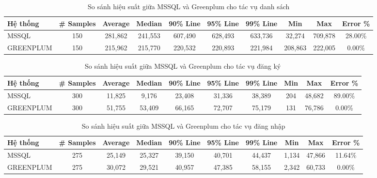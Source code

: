 \documentclass{article}[14pt]
\begin{document}
\begin{table}[htbp]
\centering
\renewcommand{\arraystretch}{1.2} %
\setlength{\tabcolsep}{3.2pt} %
\begin{tabular}{|l|c|c|c|c|c|c|c|c|c|}
\hline
\textbf{Hệ thống} & \textbf{\# Samples} & \textbf{Average} & \textbf{Median} & \textbf{90\% Line} & \textbf{95\% Line} & \textbf{99\% Line} & \textbf{Min} & \textbf{Max} & \textbf{Error \%} \\ \hline
MSSQL & 150 & 281,862 & 241,553 & 607,490 & 628,493 & 633,736 & 32,274 & 709,878 & 28.00\% \\ \hline
GREENPLUM & 150 & 215,962 & 215,770 & 220,532 & 220,893 & 221,984 & 208,863 & 222,005 & 0.00\% \\ \hline
\end{tabular}
\caption{So sánh hiệu suất giữa MSSQL và Greenplum cho tác vụ danh sách}
\label{tab:performance_comparison_list}
\end{table}


\begin{table}[htbp]
\centering
\renewcommand{\arraystretch}{1.2} %
\setlength{\tabcolsep}{4pt} %
\begin{tabular}{|l|c|c|c|c|c|c|c|c|c|}
\hline
\textbf{Hệ thống} & \textbf{\# Samples} & \textbf{Average} & \textbf{Median} & \textbf{90\% Line} & \textbf{95\% Line} & \textbf{99\% Line} & \textbf{Min} & \textbf{Max} & \textbf{Error \%} \\ \hline
MSSQL & 300 & 11,825 & 9,176 & 23,408 & 31,336 & 38,389 & 204 & 48,682 & 89.00\% \\ \hline
GREENPLUM & 300 & 51,755 & 53,409 & 66,165 & 72,707 & 75,179 & 131 & 76,786 & 0.00\% \\ \hline
\end{tabular}
\caption{So sánh hiệu suất giữa MSSQL và Greenplum cho tác vụ đăng ký}
\label{tab:performance_comparison_registration}
\end{table}

\begin{table}[htbp]
\centering
\renewcommand{\arraystretch}{1.2} %
\setlength{\tabcolsep}{3.9pt} %
\begin{tabular}{|l|c|c|c|c|c|c|c|c|c|}
\hline
\textbf{Hệ thống} & \textbf{\# Samples} & \textbf{Average} & \textbf{Median} & \textbf{90\% Line} & \textbf{95\% Line} & \textbf{99\% Line} & \textbf{Min} & \textbf{Max} & \textbf{Error \%} \\ \hline
MSSQL & 275 & 25,149 & 25,327 & 39,150 & 40,701 & 44,437 & 1,134 & 47,866 & 11.64\% \\ \hline
GREENPLUM & 275 & 30,072 & 29,521 & 40,957 & 47,385 & 58,155 & 2,342 & 60,733 & 0.00\% \\ \hline
\end{tabular}
\caption{So sánh hiệu suất giữa MSSQL và Greenplum cho tác vụ đăng nhập}
\label{tab:performance_comparison_login}
\end{table}
\end{document}
